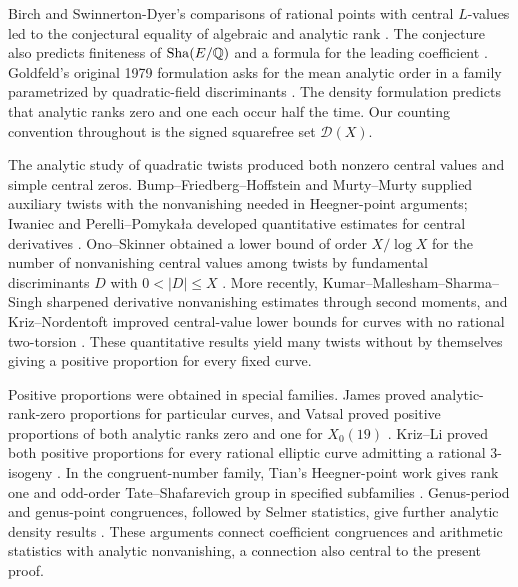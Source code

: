 Birch and Swinnerton-Dyer's comparisons of rational points with central
$L$-values led to the conjectural equality of algebraic and analytic rank
\citep{BirchSwinnertonDyer1965}. The conjecture also predicts finiteness
of $\operatorname{Sha}(E/\mathbb Q)$ and a formula for the leading coefficient
\citep[\S1, pp.~415--421]{Tate1966}.
Goldfeld's original 1979 formulation asks for the mean analytic order
in a family parametrized by quadratic-field discriminants
\citep[p.~113, Conjecture~(B)]{Goldfeld1979}.
The density formulation predicts that analytic ranks zero and one each
occur half the time. Our counting convention throughout is the signed
squarefree set $\mathcal D(X)$.

The analytic study of quadratic twists produced both nonzero central
values and simple central zeros. Bump--Friedberg--Hoffstein and
Murty--Murty supplied auxiliary twists with the nonvanishing needed in
Heegner-point arguments; Iwaniec and Perelli--Pomyka\l a developed
quantitative estimates for central derivatives
\citep{BFH1990,MurtyMurty1991,Iwaniec1990,PerelliPomykala1997}.
Ono--Skinner obtained a lower bound of order $X/\log X$ for the
number of nonvanishing central values among twists by fundamental
discriminants $D$ with $0<|D|\le X$
\citep[Corollary~3]{OnoSkinner1998}.
More recently, Kumar--Mallesham--Sharma--Singh sharpened derivative
nonvanishing estimates through second moments, and
Kriz--Nordentoft improved central-value lower bounds for curves with
no rational two-torsion
\citep[Theorem~1]{KumarEtAl2024}
\citep[Theorem~1.1 and Remark~1.2]{KrizNordentoft2025}.
These quantitative results yield many twists without by themselves
giving a positive proportion for every fixed curve.

Positive proportions were obtained in special families. James proved
analytic-rank-zero proportions for particular curves, and Vatsal proved
positive proportions of both analytic ranks zero and one for $X_0(19)$
\citep[Theorem~1]{James1998} \citep[Theorem~II]{Vatsal1998}.
Kriz--Li proved both positive proportions for every rational elliptic
curve admitting a rational $3$-isogeny
\citep[Theorem~1.5]{KrizLi2019}.
In the congruent-number family, Tian's Heegner-point work gives rank
one and odd-order Tate--Shafarevich group in specified subfamilies
\citep{Tian2014}. Genus-period and genus-point congruences, followed by
Selmer statistics, give further analytic density results
\citep{TianYuanZhang2017,SmithCongruent2016}.
These arguments connect coefficient congruences and arithmetic
statistics with analytic nonvanishing, a connection also central to
the present proof.

